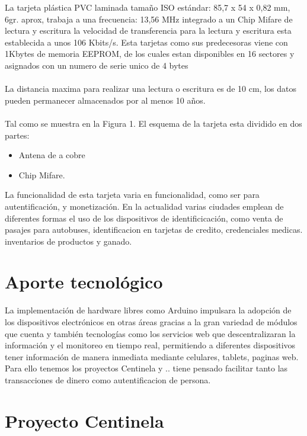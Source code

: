 \documentclass[11pt,twocolumn]{article}
\begin{document}
La tarjeta plástica PVC laminada tamaño ISO estándar: 85,7 x 54 x 0,82 mm, 6gr. aprox, trabaja a una frecuencia: 13,56 MHz integrado a un Chip Mifare de lectura y escritura la velocidad de transferencia para la lectura y escritura esta establecida a unos 106 Kbits/s. Esta tarjetas como sus predecesoras viene  con 1Kbytes de memoria EEPROM, de los cuales estan disponibles en 16 sectores y asignados con un numero de serie unico de 4 bytes\\
\\
La distancia maxima para realizar una lectura o escritura es de 10 cm, los datos pueden permanecer almacenados por al menos 10 a\~nos. \\
\\
Tal como se muestra en la Figura 1. El esquema de la tarjeta esta dividido en dos partes:\\

\begin{itemize}
	\item Antena de a cobre
	\item Chip Mifare.
\end{itemize}

La funcionalidad de esta tarjeta varia en funcionalidad, como ser para autentificaci\'on, y monetizaci\'on. En la actualidad varias ciudades emplean de diferentes formas el uso de los dispositivos de identificicaci\'on, como venta de pasajes para autobuses, identificacion en tarjetas de credito, credenciales medicas. inventarios de productos y ganado. 


\section{Aporte tecnol\'ogico}

La implementaci\'on de hardware libres como Arduino impulsara la adopci\'on de los dispositivos electr\'onicos en otras \'areas gracias a la gran variedad de m\'odulos que cuenta y tambi\'en tecnolog\'ias como los servicios web que descentralizaran la informaci\'on y el monitoreo en tiempo real, permitiendo a diferentes dispositivos tener informaci\'on de manera inmediata mediante celulares, tablets, paginas web.\\



Para ello tenemos los proyectos Centinela y  ..  tiene pensado facilitar tanto las transacciones de dinero como autentificacion de persona.

\section{Proyecto Centinela}
\end{document}
